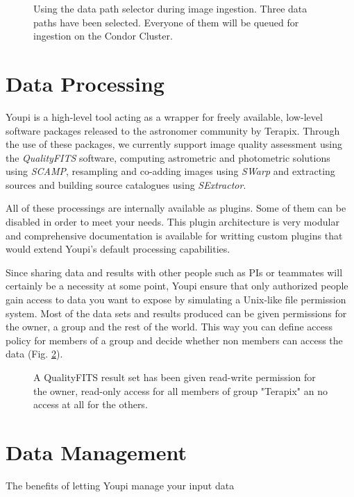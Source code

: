 \documentclass[11pt,twoside]{article}  %
\begin{document}
\begin{figure}[t]
\caption{Using the data path selector during image ingestion. Three data paths have 
been selected. Everyone of them will be queued for ingestion on the Condor Cluster.}\label{fig:pathsel}
\end{figure}

\section{Data Processing}

Youpi is a high-level tool acting as a wrapper for freely available, low-level software 
packages released to the astronomer community by Terapix. Through the use of these packages, 
we currently support image quality assessment using the \emph{QualityFITS} software, 
computing astrometric and photometric solutions using \emph{SCAMP}, resampling and co-adding 
images using \emph{SWarp} and extracting sources and building source catalogues using 
\emph{SExtractor}.

All of these processings are internally available as plugins. Some of them can be disabled 
in order to meet your needs. This plugin architecture is very modular and comprehensive 
documentation is available for writting custom plugins that would extend Youpi's default 
processing capabilities.

Since sharing data and results with other people such as PIs or teammates will certainly 
be a necessity at some point, Youpi ensure that only authorized people gain access to data 
you want to expose by simulating a Unix-like file permission system. Most of the data sets 
and results produced can be given permissions for the owner, a group and the rest of the 
world. This way you can define access policy for members of a group and decide whether non 
members can access the data (Fig. \ref{fig:permissions}).

\begin{figure}[t]
\caption{A QualityFITS result set has been given read-write permission for the owner, read-only 
access for all members of group "Terapix" an no access at all for the others.}\label{fig:permissions}
\end{figure}


\section{Data Management}
The benefits of letting Youpi manage your input data
\end{document}
